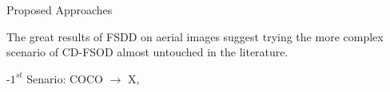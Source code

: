 \begin{subsectionframemod}{Proposed Approaches}

    The great results of FSDD on aerial images suggest trying the more complex scenario of CD-FSOD almost untouched in the literature.

    -$1^{st}$ Senario: COCO $\to$ X,

    \begin{table}[]
        \centering
         \caption{Cross-domain performance results
        on 5 scenarios COCO $\to$ DIOR / DOTA / DeepFruits (\cite{lee2022rethinking}) / SIXRay (\cite{miao2019sixray}) / VisDrone (\cite{pengfei2021visdrone}).}
        \label{tab:cd_fsod_results}
        \vspace{-1.1em}
        \end{table}


\end{subsectionframemod}

